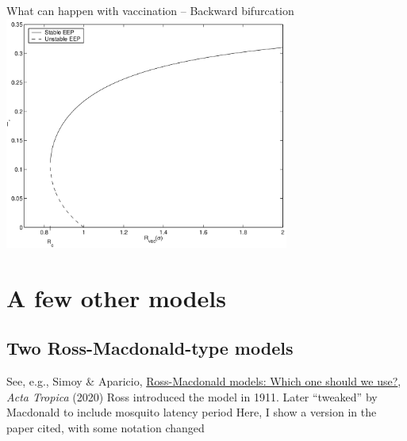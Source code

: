 \documentclass[aspectratio=169]{beamer}\usepackage[]{graphicx}\usepackage[]{xcolor}
\begin{document}
\begin{frame}{What can happen with vaccination -- Backward bifurcation}
\centering
\includegraphics[width=0.7\textwidth]{FIGS/SIRV_bif_backward}
\end{frame}


\section{A few other models}

\subsection{Two Ross-Macdonald-type models}
\begin{frame}
See, e.g., Simoy \& Aparicio, \href{https://doi.org/10.1016/j.actatropica.2020.105452}{Ross-Macdonald models: Which one should we use?}, \emph{Acta Tropica} (2020)
\vfill
Ross introduced the model in 1911. Later ``tweaked'' by Macdonald to include mosquito latency period
\vfill
Here, I show a version in the paper cited, with some notation changed
\end{frame}
\end{document}
